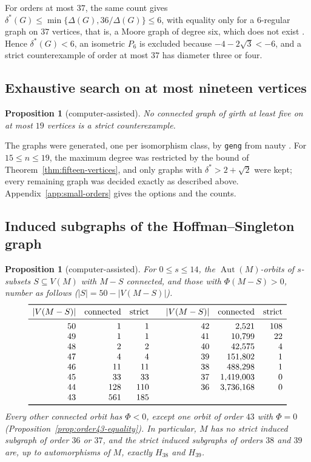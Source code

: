 \documentclass[a4paper,10pt,reqno]{amsart}
\theoremstyle{plain}
\newtheorem{proposition}[theorem]{Proposition}
\theoremstyle{definition}
\theoremstyle{remark}
\begin{document}
For orders at most \(37\), the same count gives
\(\delta^*(G)\le\min\{\Delta(G),36/\Delta(G)\}\le6\), with equality only for a
\(6\)-regular graph on \(37\) vertices, that is, a Moore graph of degree six,
which does not exist \cite{HoffmanSingleton1960}. Hence \(\delta^*(G)<6\), an
isometric \(P_6\) is excluded because \(-4-2\sqrt3<-6\), and a strict
counterexample of order at most \(37\) has diameter three or four.

\subsection{Exhaustive search on at most nineteen vertices}

\begin{proposition}[computer-assisted]\label{prop:nineteen-vertices}
No connected graph of girth at least five on at most \(19\) vertices is a
strict counterexample.
\end{proposition}

The graphs were generated, one per isomorphism class, by \texttt{geng} from
nauty \cite{McKayPiperno2014}. For \(15\le n\le19\), the maximum degree was
restricted by the bound of Theorem~\ref{thm:fifteen-vertices}, and only graphs with
\(\delta^*>2+\sqrt2\) were kept; every remaining graph was decided exactly as
described above. Appendix~\ref{app:small-orders} gives the options and the
counts.

\subsection{Induced subgraphs of the Hoffman--Singleton graph}

\begin{proposition}[computer-assisted]\label{prop:hs-classification}
For \(0\le s\le14\), the \(\operatorname{Aut}(M)\)-orbits of \(s\)-subsets
\(S\subseteq V(M)\) with \(M-S\) connected, and those with \(\Phi(M-S)>0\),
number as follows (\(|S|=50-|V(M-S)|\)).
\[
\begin{array}{rrr@{\qquad}rrr}
\toprule
|V(M-S)|&\text{connected}&\text{strict}&|V(M-S)|&\text{connected}&\text{strict}\\
\midrule
50&1&1&42&2{,}521&108\\
49&1&1&41&10{,}799&22\\
48&2&2&40&42{,}575&4\\
47&4&4&39&151{,}802&1\\
46&11&11&38&488{,}298&1\\
45&33&33&37&1{,}419{,}003&0\\
44&128&110&36&3{,}736{,}168&0\\
43&561&185&&&\\
\bottomrule
\end{array}
\]
Every other connected orbit has \(\Phi<0\), except one orbit of order \(43\)
with \(\Phi=0\) (Proposition~\ref{prop:order43-equality}). In particular,
\(M\) has no strict induced subgraph of order \(36\) or \(37\), and the strict
induced subgraphs of orders \(38\) and \(39\) are, up to automorphisms of
\(M\), exactly \(H_{38}\) and \(H_{39}\).
\end{proposition}
\end{document}
